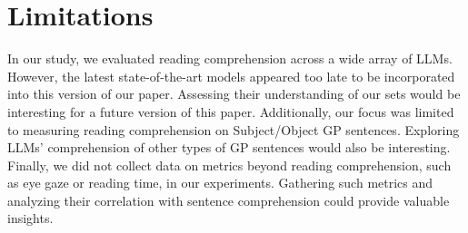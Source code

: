 \section*{Limitations}

In our study, we evaluated reading comprehension across a wide array of LLMs. However, the latest state-of-the-art models appeared too late to be incorporated into this version of our paper. Assessing their understanding of our sets would be interesting for a future version of this paper. Additionally, our focus was limited to measuring reading comprehension on Subject/Object GP sentences. Exploring LLMs' comprehension of other types of GP sentences would also be interesting. Finally, we did not collect data on metrics beyond reading comprehension, such as eye gaze or reading time, in our experiments. Gathering such metrics and analyzing their correlation with sentence comprehension could provide valuable insights.
